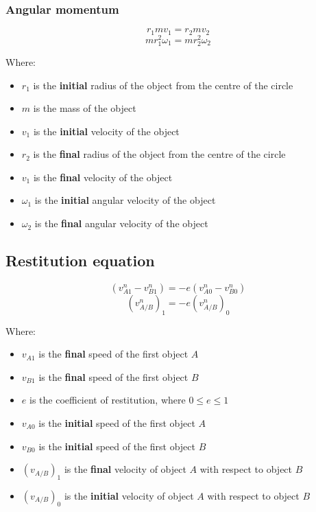 \documentclass[11pt]{article}
\begin{document}
 \newpage

\subsubsection{Angular momentum}
\label{sec:orgf95dd15}
\[r_1 mv_1 = r_2 m v_2\]
\[m r_1^2 \omega_1 = m r_2^2 \omega_2\]

Where:
\begin{itemize}
\item \(r_1\) is the \textbf{initial} radius of the object from the centre of the circle
\item \(m\) is the mass of the object
\item \(v_1\) is the \textbf{initial} velocity of the object
\item \(r_2\) is the \textbf{final} radius of the object from the centre of the circle
\item \(v_1\) is the \textbf{final} velocity of the object
\item \(\omega_1\) is the \textbf{initial} angular velocity of the object
\item \(\omega_2\) is the \textbf{final} angular velocity of the object
\end{itemize}

\subsection{Restitution equation}
\label{sec:orgd44c400}
\[(v_{A1}^n - v_{B1}^n) = - e(v_{A0}^n - v_{B0}^n)\]
\[(v_{A/B}^n)_1 = -e (v_{A/B}^n)_0\]

Where:
\begin{itemize}
\item \(v_{A1}\) is the \textbf{final} speed of the first object \(A\)
\item \(v_{B1}\) is the \textbf{final} speed of the first object \(B\)
\item \(e\) is the coefficient of restitution, where \(0 \le e \le 1\)
\item \(v_{A0}\) is the \textbf{initial} speed of the first object \(A\)
\item \(v_{B0}\) is the \textbf{initial} speed of the first object \(B\)
\item \((v_{A/B})_1\) is the \textbf{final} velocity of object \(A\) with respect to object \(B\)
\item \((v_{A/B})_0\) is the \textbf{initial} velocity of object \(A\) with respect to object \(B\)
\end{itemize}
\end{document}

